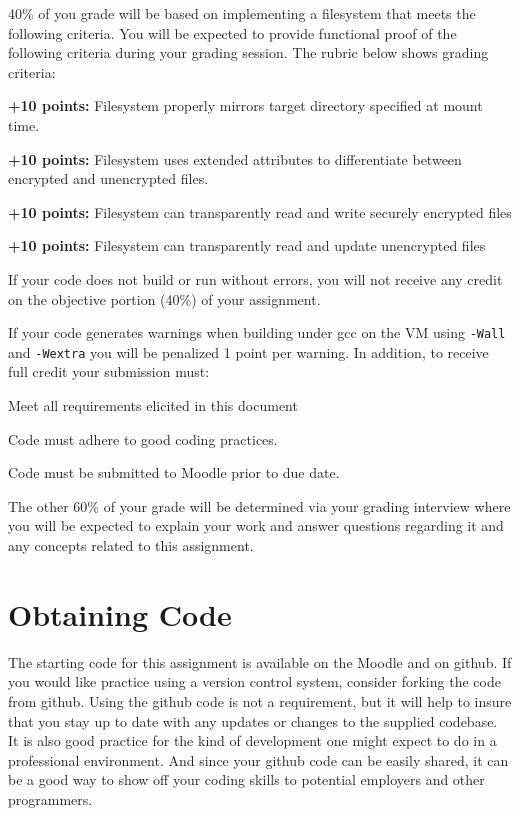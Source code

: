 \documentclass[12pt]{article}
\newenvironment{packed_item}{
\begin{itemize}
  \setlength{\itemsep}{1pt}
  \setlength{\parskip}{0pt}
  \setlength{\parsep}{0pt}
}{\end{itemize}}
\begin{document}
40\% of you grade will be based on implementing a filesystem that
meets the following criteria. You will be expected to provide
functional proof of the following criteria during your grading
session. The rubric below shows grading criteria:

\begin{packed_item}
\item {\bf +10 points:} Filesystem properly mirrors target directory
  specified at mount time.
\item {\bf +10 points:} Filesystem uses extended attributes to differentiate
  between encrypted and unencrypted files.
\item {\bf +10 points:} Filesystem can transparently read and write
  securely encrypted files 
\item {\bf +10 points:} Filesystem can transparently read and update unencrypted
  files
\end{packed_item}

If your code does not build or run without errors, you will not receive
any credit on the objective portion (40\%) of your assignment.

If your code generates warnings when building under gcc on the VM
using \texttt{-Wall} and \texttt{-Wextra} you will be penalized 1
point per warning. In addition, to receive full credit your submission must:
\begin{packed_item}
\item Meet all requirements elicited in this document
\item Code must adhere to good coding practices.
\item Code must be submitted to Moodle prior to due date.
\end{packed_item}

The other 60\% of your grade will be determined via your grading
interview where you will be expected to explain your work and answer
questions regarding it and any concepts related to this assignment.

\section{Obtaining Code}
The starting code for this assignment is available on the Moodle and
on github. If you would like practice using a version control system,
consider forking the code from github. Using the github code is not
a requirement, but it will help to insure that you stay up to date
with any updates or changes to the supplied codebase. It is also
good practice for the kind of development one might expect to do in
a professional environment. And since your github code can be easily
shared, it can be a good way to show off your coding skills to
potential employers and other programmers.
\end{document}
